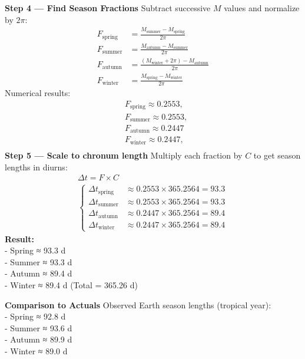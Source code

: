 \documentclass[
  letterpaper,
]{book}
\begin{document}
\textbf{Step 4 --- Find Season Fractions} Subtract successive \(M\)
values and normalize by \(2\pi\):\\
\[
\begin{aligned}
F_\text{spring} &= \frac{M_\text{summer} - M_\text{spring}}{2\pi} \\[6pt]
F_\text{summer} &= \frac{M_\text{autumn} - M_\text{summer}}{2\pi} \\[6pt]
F_\text{autumn} &= \frac{(M_\text{winter}+2\pi) - M_\text{autumn}}{2\pi} \\[6pt]
F_\text{winter} &= \frac{M_\text{spring} - M_\text{winter}}{2\pi}
\end{aligned}
\] Numerical results:\\
\[
\begin{align}
&F_\text{spring} \approx 0.2553, \\[.5em]
&F_\text{summer} \approx 0.2553, \\[.5em]
&F_\text{autumn} \approx 0.2447 \\[0.5em]
&F_\text{winter} \approx 0.2447, \\[.5em]
\end{align}
\] \textbf{Step 5 --- Scale to chronum length} Multiply each fraction by
\(C\) to get season lengths in diurns:\\
\[
\begin{gather}
\Delta t = F \times C \\[1em]
\begin{cases}
\Delta t_\text{spring} &\approx 0.2553 \times 365.2564 = 93.3 \\
\Delta t_\text{summer} &\approx 0.2553 \times 365.2564 = 93.3 \\
\Delta t_\text{autumn} &≈ 0.2447 \times 365.2564 = 89.4 \\
\Delta t_\text{winter} &≈ 0.2447 \times 365.2564 = 89.4
\end{cases}
\end{gather}
\] \textbf{Result:}\\
- Spring ≈ 93.3 d\\
- Summer ≈ 93.3 d\\
- Autumn ≈ 89.4 d\\
- Winter ≈ 89.4 d (Total = 365.26 d)

\textbf{Comparison to Actuals} Observed Earth season lengths (tropical
year):\\
- Spring ≈ 92.8 d\\
- Summer ≈ 93.6 d\\
- Autumn ≈ 89.9 d\\
- Winter ≈ 89.0 d
\end{document}
